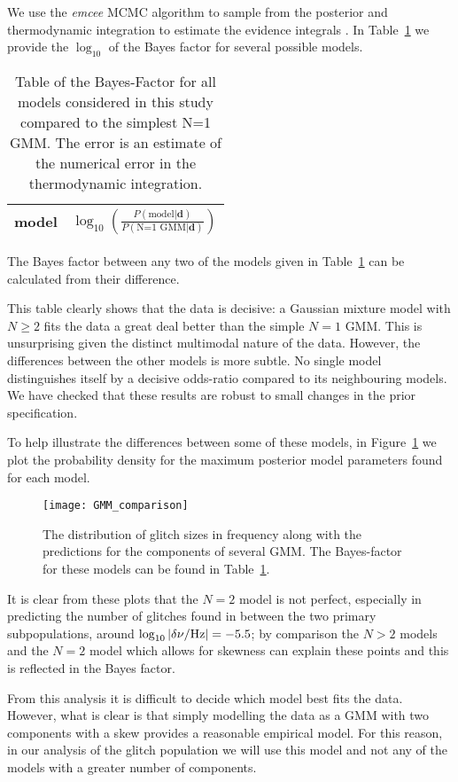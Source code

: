 \documentclass[../full_thesis/full_thesis.tex]{subfiles}
\newcommand{\thisdir}{../glitches_in_CGW}
\begin{document}
\begin{subappendices}
We use the \emph{emcee} \citep{Foreman-Mackay2013} MCMC algorithm to sample from the
posterior and thermodynamic integration to estimate the evidence integrals
\citep{Goggans2004}. In Table~\ref{tab: BF} we provide the $\log_{10}$ of the
Bayes factor for several possible models.
\begin{table}[htb]
\centering
\begin{tabular}{l|c}
model & $\log_{10}\left(
\frac{P(\textrm{model}| \mathbf{d})}{P(\textrm{N=1 GMM}| \mathbf{d})}
\right)$ \\ \hline

\end{tabular}
\caption{Table of the Bayes-Factor for all models considered in this study
compared to the simplest N=1 GMM. The error is an estimate of the numerical
error in the thermodynamic integration. }
\label{tab: BF}
\end{table}
The Bayes factor between any two of the models given in Table~\ref{tab: BF} can
be calculated from their difference.

This table clearly shows that the data is decisive: a Gaussian mixture model
with $N \ge 2$ fits the data a great deal better than the simple $N=1$ GMM.
This is unsurprising given the distinct multimodal nature of the data.
However, the differences between the other models is more subtle. No single model
distinguishes itself by a decisive odds-ratio compared to its neighbouring
models. We
have checked that these results are robust to small changes in the prior
specification.

To help illustrate the differences between some of these models, in Figure~\ref{fig: pdf}
we plot the probability density for the maximum posterior model parameters
found for each model.
\begin{figure}[htb]
\centering
\texttt{[image: GMM\_comparison]}
\caption{The distribution of glitch sizes in frequency along with the predictions
         for the components of several GMM. The Bayes-factor for these models
         can be found in Table~\ref{tab: BF}.}
\label{fig: pdf}
\end{figure}
It is clear from these plots that the $N=2$ model is not perfect, especially in predicting
the number of glitches found in between the two primary subpopulations,
around $\log_{10}|\delta\nu/\textrm{Hz}|=-5.5$; by comparison the
$N>2$ models and the $N=2$ model which allows for skewness can explain these
points and this is reflected in the Bayes factor.

From this analysis it is difficult to decide which model best fits the data. However,
what is clear is that simply modelling the data as a GMM with two components with
a skew provides a reasonable empirical model. For this reason, in our analysis of the
glitch population we will use this model and not any of the
models with a greater number of components.


\end{subappendices}
\end{document}
